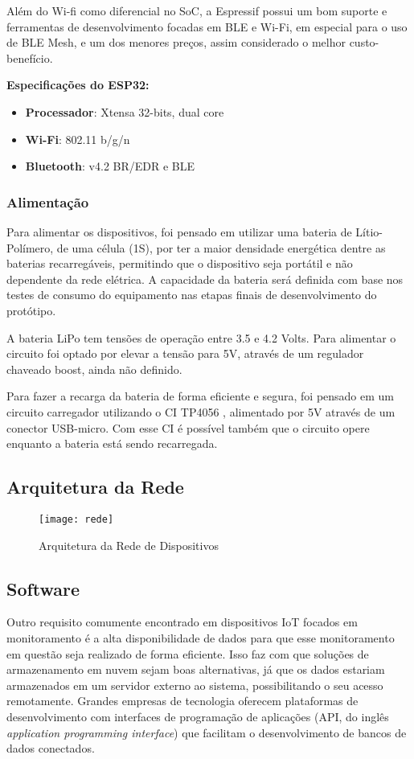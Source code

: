 \documentclass[../monografia.tex]{subfiles}
\begin{document}
Além do Wi-fi como diferencial no SoC, a Espressif possui um bom suporte e ferramentas de desenvolvimento focadas em BLE e Wi-Fi, em especial para o uso de BLE Mesh, e um dos menores preços, assim considerado o melhor custo-benefício. 

\textbf{Especificações do ESP32:} \cite{ESP-datasheet}
\begin{itemize}
\item \textbf{Processador}: Xtensa 32-bits, dual core
\item \textbf{Wi-Fi}: 802.11 b/g/n
\item \textbf{Bluetooth}: v4.2 BR/EDR e BLE
\end{itemize}



\subsubsection{Alimentação}

Para alimentar os dispositivos, foi pensado em utilizar uma bateria de Lítio-Polímero, de uma célula (1S), por ter a maior densidade energética dentre as baterias recarregáveis, permitindo que o dispositivo seja portátil e não dependente da rede elétrica. A capacidade da bateria será definida com base nos testes de consumo do equipamento nas etapas finais de desenvolvimento do protótipo. 

A bateria LiPo tem tensões de operação entre 3.5 e 4.2 Volts. Para alimentar o circuito foi optado por elevar a tensão para 5V, através de um regulador chaveado boost, ainda não definido. 

Para fazer a recarga da bateria de forma eficiente e segura, foi pensado em um circuito carregador utilizando o CI TP4056 \cite{tp4056}, alimentado por 5V através de um conector USB-micro. Com esse CI é possível também que o circuito opere enquanto a bateria está sendo recarregada. 

\subsection{Arquitetura da Rede}

\begin{figure}[h]
\centering
    \texttt{[image: rede]}
    \caption{Arquitetura da Rede de Dispositivos}
    \label{fig:rede}
\end{figure}

\subsection{Software}
Outro requisito comumente encontrado em dispositivos IoT focados em monitoramento é a alta disponibilidade de dados para que esse monitoramento em questão seja realizado de forma eficiente. Isso faz com que soluções de armazenamento em nuvem sejam boas alternativas, já que os dados estariam armazenados em um servidor externo ao sistema, possibilitando o seu acesso remotamente. Grandes empresas de tecnologia oferecem plataformas de desenvolvimento com interfaces de programação de aplicações (API, do inglês \textit{application programming interface}) que facilitam o desenvolvimento de bancos de dados conectados.

\end{document}

